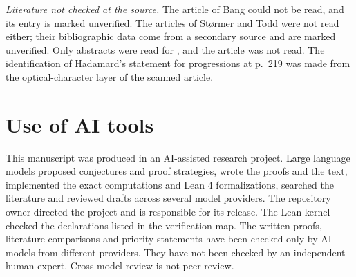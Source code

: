 \documentclass[11pt]{article}
\begin{document}
\emph{Literature not checked at the source.} The article of Bang \cite{bang} could not be read, and its entry is marked unverified. The articles of St{\o}rmer \cite{storm} and Todd \cite{todd} were not read either; their bibliographic data come from a secondary source and are marked unverified. Only abstracts were read for \cite{boyd,bris}, and the article \cite{el} was not read. The identification of Hadamard's statement for progressions at p.~219 \cite{hadamard} was made from the optical-character layer of the scanned article.

\section{Use of AI tools}

This manuscript was produced in an AI-assisted research project. Large language models proposed conjectures and proof strategies, wrote the proofs and the text, implemented the exact computations and Lean 4 formalizations, searched the literature and reviewed drafts across several model providers. The repository owner directed the project and is responsible for its release. The Lean kernel checked the declarations listed in the verification map. The written proofs, literature comparisons and priority statements have been checked only by AI models from different providers. They have not been checked by an independent human expert. Cross-model review is not peer review.



\end{document}
